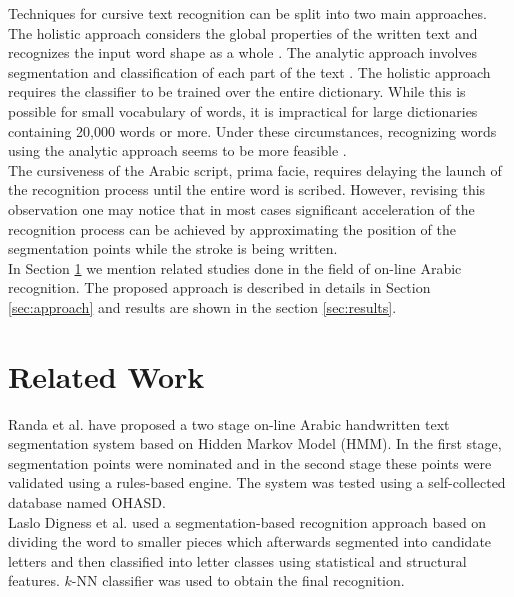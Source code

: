 \documentclass[journal,compsoc]{IEEEtran}
\begin{document}
Techniques for cursive text recognition can be split into two main approaches. 
The holistic approach considers the global properties of the written text and recognizes the input word shape as a whole \cite{biadsy2011segmentation, saabni2009hierarchical}. 
The analytic approach involves segmentation and classification of each part of the text \cite{abdulla2008off, sari2002off, Dinges2011}. 
The holistic approach requires the classifier to be trained over the entire dictionary. 
While this is possible for small vocabulary of words, it is impractical for large dictionaries containing 20,000 words or more. 
Under these circumstances, recognizing words using the analytic approach seems to be more feasible \cite{elanwar2012unconstrained}.\\

The cursiveness of the Arabic script, prima facie, requires delaying the launch of the recognition process until the entire word is scribed. 
However, revising this observation one may notice that in most cases significant acceleration of the recognition process can be achieved by approximating the position of the segmentation points while the stroke is being written.\\

In Section \ref{sec:related_work} we mention related studies done in the field of on-line Arabic recognition. 
The proposed approach is described in details in Section \ref{sec:approach} and results are shown in the section \ref{sec:results}. 

\section{Related Work}
\label{sec:related_work}

Randa et al. \cite{elanwar2012unconstrained} have proposed a two stage on-line Arabic handwritten text segmentation system based on Hidden Markov Model (HMM). 
In the first stage, segmentation points were nominated and in the second stage these points were validated using a rules-based engine. 
The system was tested using a self-collected database named OHASD.\\

Laslo Digness et al. \cite{Dinges2011} used a segmentation-based recognition approach based on dividing the word to smaller pieces which afterwards segmented into candidate letters and then classified into letter classes using statistical and structural features. 
$k$-NN classifier was used to obtain the final recognition.\\
\end{document}
